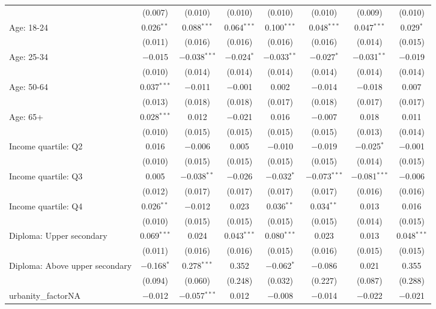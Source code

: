 \begin{tabular}{@{\extracolsep{5pt}}lccccccc}
  & (0.007) & (0.010) & (0.010) & (0.010) & (0.010) & (0.009) & (0.010) \\ 
  Age: 18\mbox{-}24 & 0.026$^{**}$ & 0.088$^{***}$ & 0.064$^{***}$ & 0.100$^{***}$ & 0.048$^{***}$ & 0.047$^{***}$ & 0.029$^{*}$ \\ 
  & (0.011) & (0.016) & (0.016) & (0.016) & (0.016) & (0.014) & (0.015) \\ 
  Age: 25\mbox{-}34 & $-$0.015 & $-$0.038$^{***}$ & $-$0.024$^{*}$ & $-$0.033$^{**}$ & $-$0.027$^{*}$ & $-$0.031$^{**}$ & $-$0.019 \\ 
  & (0.010) & (0.014) & (0.014) & (0.014) & (0.014) & (0.014) & (0.014) \\ 
  Age: 50\mbox{-}64 & 0.037$^{***}$ & $-$0.011 & $-$0.001 & 0.002 & $-$0.014 & $-$0.018 & 0.007 \\ 
  & (0.013) & (0.018) & (0.018) & (0.017) & (0.018) & (0.017) & (0.017) \\ 
  Age: 65+ & 0.028$^{***}$ & 0.012 & $-$0.021 & 0.016 & $-$0.007 & 0.018 & 0.011 \\ 
  & (0.010) & (0.015) & (0.015) & (0.015) & (0.015) & (0.013) & (0.014) \\ 
  Income quartile: Q2 & 0.016 & $-$0.006 & 0.005 & $-$0.010 & $-$0.019 & $-$0.025$^{*}$ & $-$0.001 \\ 
  & (0.010) & (0.015) & (0.015) & (0.015) & (0.015) & (0.014) & (0.015) \\ 
  Income quartile: Q3 & 0.005 & $-$0.038$^{**}$ & $-$0.026 & $-$0.032$^{*}$ & $-$0.073$^{***}$ & $-$0.081$^{***}$ & $-$0.006 \\ 
  & (0.012) & (0.017) & (0.017) & (0.017) & (0.017) & (0.016) & (0.016) \\ 
  Income quartile: Q4 & 0.026$^{**}$ & $-$0.012 & 0.023 & 0.036$^{**}$ & 0.034$^{**}$ & 0.013 & 0.016 \\ 
  & (0.010) & (0.015) & (0.015) & (0.015) & (0.015) & (0.014) & (0.015) \\ 
  Diploma: Upper secondary & 0.069$^{***}$ & 0.024 & 0.043$^{***}$ & 0.080$^{***}$ & 0.023 & 0.013 & 0.048$^{***}$ \\ 
  & (0.011) & (0.016) & (0.016) & (0.015) & (0.016) & (0.015) & (0.015) \\ 
  Diploma: Above upper secondary & $-$0.168$^{*}$ & 0.278$^{***}$ & 0.352 & $-$0.062$^{*}$ & $-$0.086 & 0.021 & 0.355 \\ 
  & (0.094) & (0.060) & (0.248) & (0.032) & (0.227) & (0.087) & (0.288) \\ 
  urbanity\_factorNA & $-$0.012 & $-$0.057$^{***}$ & 0.012 & $-$0.008 & $-$0.014 & $-$0.022 & $-$0.021 \\ 

\end{tabular}

